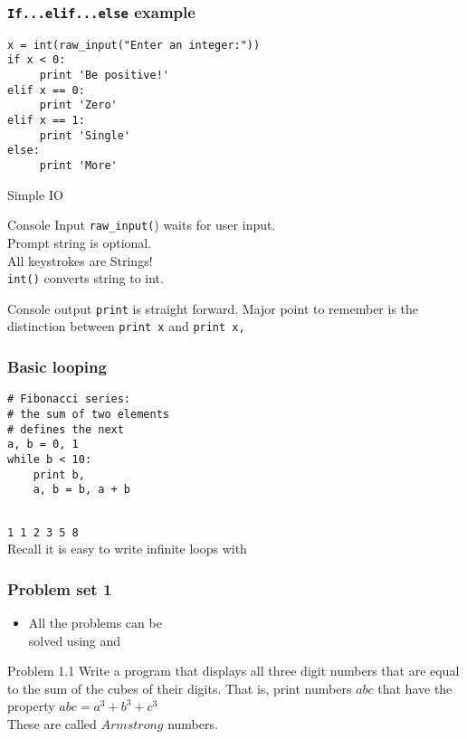 \documentclass[14pt,compress]{beamer}
\newcounter{time}
\newcommand{\inctime}[1]{\addtocounter{time}{#1}{\tiny \thetime\ m}}
\newcommand{\typ}[1]{\texttt{#1}}
\newcommand{\kwrd}[1]{ \texttt{\textbf{\color{blue}{#1}}}  }
\begin{document}
\begin{frame}[fragile]
  \frametitle{\typ{If...elif...else} example}
\begin{lstlisting}
x = int(raw_input("Enter an integer:"))
if x < 0:
     print 'Be positive!'
elif x == 0:
     print 'Zero'
elif x == 1:
     print 'Single'
else:
     print 'More'
\end{lstlisting}
\end{frame}

\begin{frame}{Simple IO}
  \begin{block}
    {Console Input}
    \texttt{raw\_input(}) waits for user input.\\Prompt string is optional.\\
    All keystrokes are Strings!\\\texttt{int()} converts string to int.
  \end{block}
  \begin{block}
    {Console output}
    \texttt{print} is straight forward. Major point to remember is the distinction between \texttt{print x} and \texttt{print x,}
  \end{block}
\end{frame}

\begin{frame}[fragile]
  \frametitle{Basic looping}
  \begin{lstlisting}
# Fibonacci series:
# the sum of two elements
# defines the next
a, b = 0, 1
while b < 10:
    print b,
    a, b = b, a + b
 
\end{lstlisting}
\typ{1 1 2 3 5 8}\\  
\alert{Recall it is easy to write infinite loops with \kwrd{while}}
  \inctime{20}
\end{frame}


\begin{frame}
  \frametitle{Problem set 1}
  \begin{itemize}
    \item All the problems can be\\
      solved using \kwrd{if} and \kwrd{while} 
  \end{itemize}
\end{frame}

\begin{frame}{Problem 1.1}
  Write a program that displays all three digit numbers that are equal to the sum of the cubes of their digits. That is, print numbers $abc$ that have the property $abc = a^3 + b^3 + c^3$\\
These are called $Armstrong$ numbers.
\end{frame}
  
\end{document}
